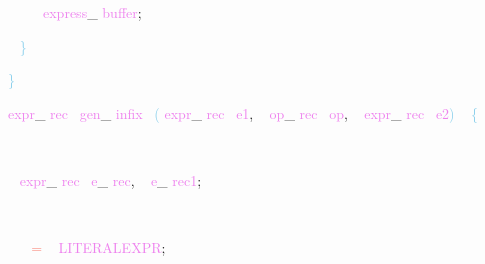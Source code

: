 \documentclass[8, usernames, dvipsnames]{beamer}
\begin{document}
\begin{frame}
\textcolor{White}{\   }
\textcolor{White}{\   }
\textcolor{OrangeRed}{	}
\textcolor{White}{\ }
\textcolor{Violet}{express}\textcolor{Sepia}{\_}
\textcolor{Violet}{buffer}\textcolor{Sepia}{;}

 \textcolor{White}{\   }
\textcolor{SkyBlue}{\} }

 
 \textcolor{SkyBlue}{\} }

 
 \textcolor{Violet}{expr}\textcolor{Sepia}{\_}
\textcolor{Violet}{rec}\textcolor{White}{\ }
\textcolor{Violet}{gen}\textcolor{Sepia}{\_}
\textcolor{Violet}{infix}\textcolor{White}{\ }
\textcolor{SkyBlue}{(}
\textcolor{Violet}{expr}\textcolor{Sepia}{\_}
\textcolor{Violet}{rec}\textcolor{White}{\ }
\textcolor{Violet}{e1}\textcolor{Sepia}{,}
\textcolor{White}{\ }
\textcolor{Violet}{op}\textcolor{Sepia}{\_}
\textcolor{Violet}{rec}\textcolor{White}{\ }
\textcolor{Violet}{op}\textcolor{Sepia}{,}
\textcolor{White}{\ }
\textcolor{Violet}{expr}\textcolor{Sepia}{\_}
\textcolor{Violet}{rec}\textcolor{White}{\ }
\textcolor{Violet}{e2}\textcolor{SkyBlue}{)}
\textcolor{White}{\ }
\textcolor{SkyBlue}{\{ }

 \textcolor{White}{\   }

 \textcolor{White}{\   }
\textcolor{Violet}{expr}\textcolor{Sepia}{\_}
\textcolor{Violet}{rec}\textcolor{White}{\ }
\textcolor{Violet}{e}\textcolor{Sepia}{\_}
\textcolor{Violet}{rec}\textcolor{Sepia}{,}
\textcolor{White}{\ }
\textcolor{Violet}{e}\textcolor{Sepia}{\_}
\textcolor{Violet}{rec1}\textcolor{Sepia}{;}

 \textcolor{White}{\   }

 \textcolor{White}{\   }
\textcolor{White}{\ }
\textcolor{Salmon}{=}
\textcolor{White}{\ }
\textcolor{Violet}{LITERALEXPR}\textcolor{Sepia}{;}

 \end{frame}
\end{document}
